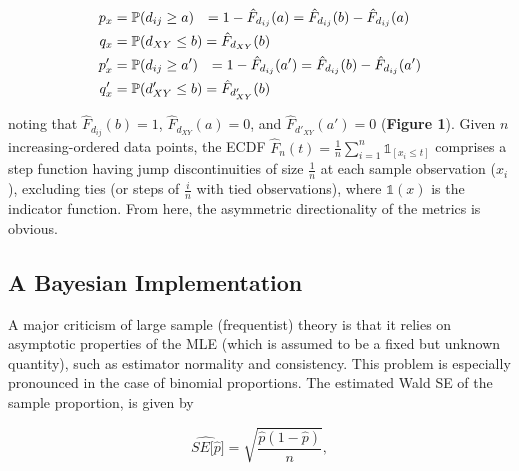 \documentclass[12pt]{article}
\begin{document}
\begin{align}
p_x &= \mathbb{P}(d_{ij} \geq a) \hspace{2.5mm} = 1 - \hat{F}_{d_{ij}}(a) = \hat{F}_{d_{ij}}(b) - \hat{F}_{d_{ij}}(a)  \\
q_x &= \mathbb{P}(d_{XY} \leq b) = \hat{F}_{d_{XY}}(b) \\
p'_x &= \mathbb{P}(d_{ij} \geq a') \hspace{2.5mm} = 1 - \hat{F}_{d_{ij}}(a') = \hat{F}_{d_{ij}}(b) - \hat{F}_{d_{ij}}(a') \\
q'_x &= \mathbb{P}(d'_{XY} \leq b) = \hat{F}_{d'_{XY}}(b)
\end{align}

\noindent noting that $\hat{F}_{d_{ij}}(b) = 1$, $\hat{F}_{d_{XY}}(a) = 0$, and $\hat{F}_{d'_{XY}}(a') = 0$ (\textbf{Figure 1}). Given $n$ \\ increasing-ordered data points, the ECDF $\hat{F}_n(t) = \frac{1}{n}\sum_{i = 1}^n\mathds{1}_{[x_i \leq t]}$ comprises a step function having jump discontinuities of size $\frac{1}{n}$ at each sample observation ($x_i$), excluding ties (or steps of $\frac{i}{n}$ with tied observations), where $\mathds{1}(x)$ is the indicator function. From here, the asymmetric directionality of the metrics is obvious. 


\subsection{A Bayesian Implementation}

A major criticism of large sample (frequentist) theory is that it relies on asymptotic properties of the MLE (which is assumed to be a fixed but unknown quantity), such as estimator normality and consistency. This problem is especially pronounced in the case of binomial proportions. The estimated Wald SE of the sample proportion, is given by 

\begin{equation}
\widehat{SE[\hat{p}}] = \sqrt{\frac{\hat{p}(1 - \hat{p})}{n}},
\end{equation}
\end{document}
